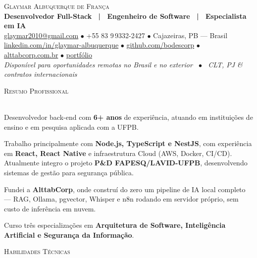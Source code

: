 \documentclass[a4paper]{article}
\newcommand{\lineunder}{
    \vspace*{-8pt} \\
    \hspace*{-18pt} \hrulefill \\
}
\newcommand{\header}[1]{
    {\hspace*{-18pt}\vspace*{6pt} \textsc{#1}}
    \vspace*{-6pt} \lineunder
}
\begin{document}
\vspace*{-40pt}

\begin{center}
    {\Huge \scshape {Glaymar Albuquerque de Fran\c{c}a}}\\
    \vspace*{4pt}
    {\large \textbf{Desenvolvedor Full-Stack \ | \ Engenheiro de Software \ | \ Especialista em IA}}\\
    \vspace*{4pt}
    \href{mailto:glaymar2010@gmail.com}{glaymar2010@gmail.com}
    $\bullet$ +55 83 9\,9332-2427
    $\bullet$ Cajazeiras, PB — Brasil\\
    \vspace*{2pt}
    \href{https://linkedin.com/in/glaymar-albuquerque-de-fran\%C3\%A7a}{linkedin.com/in/glaymar-albuquerque}
    $\bullet$ \href{https://github.com/bodescorp}{github.com/bodescorp}
    $\bullet$ \href{https://alttabcorp.com.br}{alttabcorp.com.br}
    $\bullet$ \href{https://bodescorp.github.io/GlaymarAdeFranca/}{portf\'{o}lio}\\
    \vspace*{3pt}
    \textit{Disponível para oportunidades remotas no Brasil e no exterior \ $\bullet$ \ CLT, PJ \& contratos internacionais}
\end{center}

\header{Resumo Profissional}
\vspace{2mm}

Desenvolvedor back-end com \textbf{6+ anos} de experiência,
atuando em instituições de ensino e em pesquisa aplicada
com a UFPB.

Trabalho principalmente com \textbf{Node.js, TypeScript e NestJS},
com experiência em \textbf{React, React Native} e infraestrutura Cloud (AWS, Docker, CI/CD). 
Atualmente integro o projeto
\textbf{P\&D FAPESQ/LAVID-UFPB}, desenvolvendo sistemas de
gestão para segurança pública.

Fundei a \textbf{AlttabCorp}, onde construí do zero um pipeline
de IA local completo — RAG, Ollama, pgvector, Whisper e n8n
rodando em servidor próprio, sem custo de inferência em nuvem.

Curso três especializações em \textbf{Arquitetura
de Software, Inteligência Artificial e Segurança da Informação}.

\vspace{3mm}

\header{Habilidades Técnicas}
\vspace{2mm}
\end{document}
